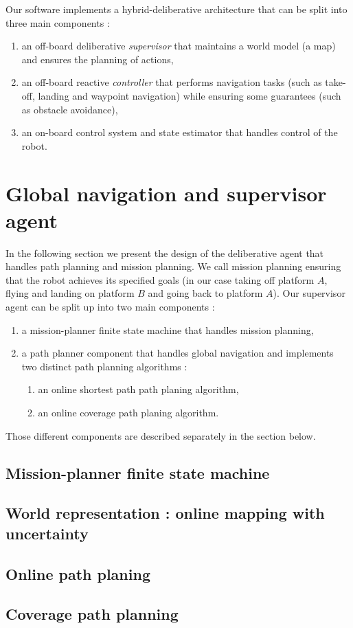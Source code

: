 \documentclass[11pt]{article}
\begin{document}
Our software implements a hybrid-deliberative architecture that can be split into three main components :
\begin{enumerate}
    \item an off-board deliberative \textit{supervisor} that maintains a world model (a map) and ensures the planning of actions,
    \item an off-board reactive \textit{controller} that performs navigation tasks (such as take-off, landing and waypoint navigation) while ensuring some guarantees (such as obstacle avoidance),
    \item an on-board control system and state estimator that handles control of the robot.
\end{enumerate}


\section{Global navigation and supervisor agent}

In the following section we present the design of the deliberative agent that handles path planning and mission planning. We call mission planning ensuring that the robot achieves its specified goals (in our case taking off platform $A$, flying and landing on platform $B$ and going back to platform $A$). Our supervisor agent can be split up into two main components : 
\begin{enumerate}
    \item a mission-planner finite state machine that handles mission planning,
    \item a path planner component that handles global navigation and implements two distinct path planning algorithms : 
    \begin{enumerate}
        \item an online shortest path path planing algorithm,
        \item an online coverage path planing algorithm.
    \end{enumerate}
\end{enumerate}

Those different components are described separately in the section below.


\subsection{Mission-planner finite state machine}

\subsection{World representation : online mapping with uncertainty}

\subsection{Online path planing}

\subsection{Coverage path planning}

\cite{epsilon_star} \cite{Galceran13asurvey} \cite{recsplit}

\tableofcontents

\printbibliography %
\end{document}
